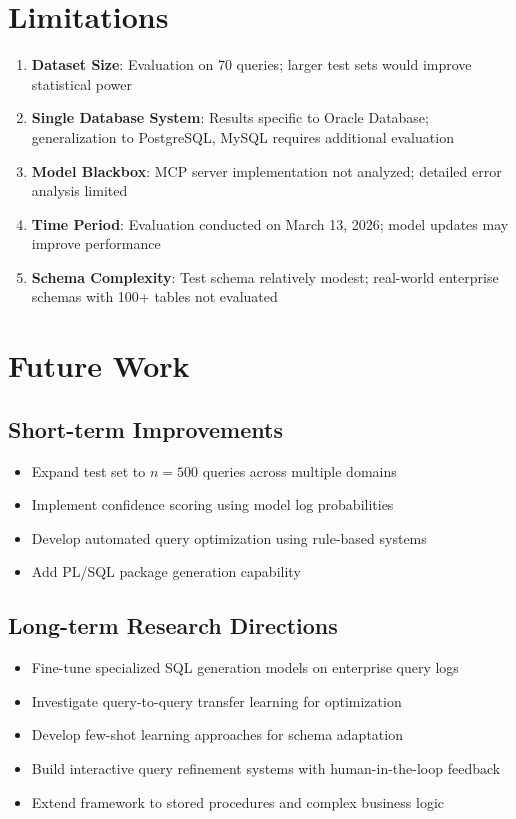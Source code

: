 \documentclass[11pt,a4paper]{article}
\begin{document}
\section{Limitations}

\begin{enumerate}
    \item \textbf{Dataset Size}: Evaluation on 70 queries; larger test sets would improve statistical power
    \item \textbf{Single Database System}: Results specific to Oracle Database; generalization to PostgreSQL, MySQL requires additional evaluation
    \item \textbf{Model Blackbox}: MCP server implementation not analyzed; detailed error analysis limited
    \item \textbf{Time Period}: Evaluation conducted on March 13, 2026; model updates may improve performance
    \item \textbf{Schema Complexity}: Test schema relatively modest; real-world enterprise schemas with 100+ tables not evaluated
\end{enumerate}

\section{Future Work}

\subsection{Short-term Improvements}
\begin{itemize}
    \item Expand test set to $n=500$ queries across multiple domains
    \item Implement confidence scoring using model log probabilities
    \item Develop automated query optimization using rule-based systems
    \item Add PL/SQL package generation capability
\end{itemize}

\subsection{Long-term Research Directions}
\begin{itemize}
    \item Fine-tune specialized SQL generation models on enterprise query logs
    \item Investigate query-to-query transfer learning for optimization
    \item Develop few-shot learning approaches for schema adaptation
    \item Build interactive query refinement systems with human-in-the-loop feedback
    \item Extend framework to stored procedures and complex business logic
\end{itemize}
\end{document}
